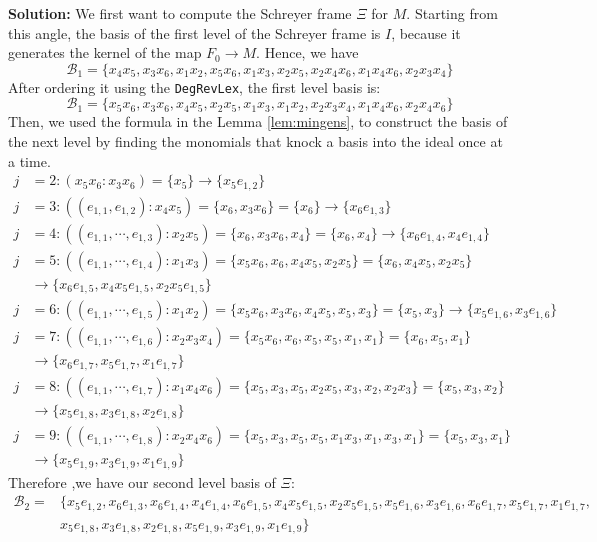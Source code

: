 \documentclass{article}
\theoremstyle{definition}
\theoremstyle{remark}
\theoremstyle{example}
\begin{document}
\textbf{Solution:} We first want to compute the Schreyer frame $\Xi$ for $M$. Starting from this angle, the basis of the first level of the Schreyer frame is $I$, because it generates the kernel of the map $F_0 \rightarrow M$. Hence, we have 
\begin{equation}
    \mathcal{B}_1 = \{x_4x_5,x_3x_6,x_1x_2,x_5x_6,x_1x_3,x_2x_5,x_2x_4x_6,x_1x_4x_6,x_2x_3x_4\}
\end{equation}
After ordering it using the \verb+DegRevLex+, the first level basis is:
\begin{equation}
    \mathcal{B}_1 = \{x_5x_6,x_3x_6,x_4x_5,x_2x_5,x_1x_3,x_1x_2,x_2x_3x_4,x_1x_4x_6,x_2x_4x_6\}
\end{equation}
Then, we used the formula in the Lemma \ref{lem:mingens}, to construct the basis of the next level by finding the monomials that knock a basis into the ideal once at a time.
\begin{align}
    j &= 2: (x_5x_6:x_3x_6) = \{x_5\} \rightarrow \{x_5e_{1,2}\}\\
    j &= 3: ((e_{1,1},e_{1,2}):x_4x_5) = \{x_6,x_3x_6\} = \{x_6\} \rightarrow \{x_6e_{1,3}\}\\
    j &= 4: ((e_{1,1},\cdots,e_{1,3}):x_2x_5) = \{x_6,x_3x_6,x_4\} = \{x_6,x_4\} \rightarrow \{x_6e_{1,4},x_4e_{1,4}\}\\
    j &= 5: ((e_{1,1},\cdots,e_{1,4}):x_1x_3) = \{x_5x_6,x_6,x_4x_5,x_2x_5\} = \{x_6,x_4x_5,x_2x_5\}\\
    &\rightarrow \{x_6e_{1,5},x_4x_5e_{1,5},x_2x_5e_{1,5}\}\\
    j &= 6: ((e_{1,1},\cdots,e_{1,5}):x_1x_2) = \{x_5x_6,x_3x_6,x_4x_5,x_5,x_3\} = \{x_5,x_3\}\rightarrow \{x_5e_{1,6},x_3e_{1,6}\}\\
    j &= 7: ((e_{1,1},\cdots,e_{1,6}):x_2x_3x_4) = \{x_5x_6,x_6,x_5,x_5,x_1,x_1\} = \{x_6,x_5,x_1\}\\
    &\rightarrow \{x_6e_{1,7},x_5e_{1,7},x_1e_{1,7}\}\\
    j &= 8: ((e_{1,1},\cdots,e_{1,7}):x_1x_4x_6) = \{x_5,x_3,x_5,x_2x_5,x_3,x_2,x_2x_3\} = \{x_5,x_3,x_2\}\\
    &\rightarrow \{x_5e_{1,8},x_3e_{1,8},x_2e_{1,8}\}\\
    j &= 9: ((e_{1,1},\cdots,e_{1,8}):x_2x_4x_6) = \{x_5,x_3,x_5,x_5,x_1x_3,x_1,x_3,x_1\} = \{x_5,x_3,x_1\}\\
    &\rightarrow \{x_5e_{1,9},x_3e_{1,9},x_1e_{1,9}\}
\end{align}
Therefore ,we have our second level basis of $\Xi$:
\begin{equation}
    \begin{aligned}
        \mathcal{B}_2 = &\{x_5e_{1,2},x_6e_{1,3},x_6e_{1,4},x_4e_{1,4},x_6e_{1,5},x_4x_5e_{1,5},x_2x_5e_{1,5},x_5e_{1,6},x_3e_{1,6},x_6e_{1,7},x_5e_{1,7},x_1e_{1,7},\\
        &x_5e_{1,8},x_3e_{1,8},x_2e_{1,8},x_5e_{1,9},x_3e_{1,9},x_1e_{1,9}\}
    \end{aligned}
\end{equation}
\end{document}
